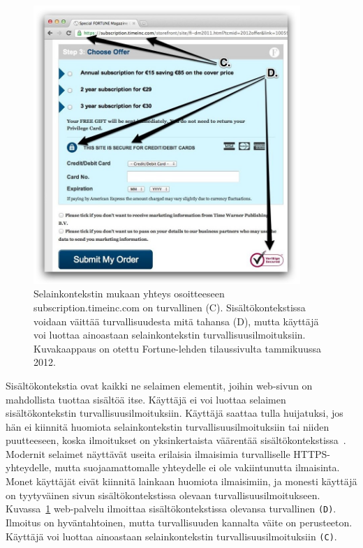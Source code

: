 \documentclass[finnish,gradu]{tktltiki}
\begin{document}
  \begin{figure}[h!]
    \centering
    \includegraphics[width=0.9\textwidth]{images/trust_context_html.jpg}
    \caption[Sisältökontekstin esittely.]{Selainkontekstin mukaan yhteys osoitteeseen subscription.timeinc.com on turvallinen (C). Sisältökontekstissa voidaan väittää turvallisuudesta mitä tahansa (D), mutta käyttäjä voi luottaa ainoastaan selainkontekstin turvallisuusilmoituksiin. Kuvakaappaus on otettu Fortune-lehden tilaussivulta tammikuussa 2012.}
    \label{fig:trust_context_html}
  \end{figure}

  Sisältökontekstia ovat kaikki ne selaimen elementit, joihin web-sivun on mahdollista tuottaa sisältöä itse. Käyttäjä ei voi luottaa selaimen sisältökontekstin turvallisuusilmoituksiin. Käyttäjä saattaa tulla huijatuksi, jos hän ei kiinnitä huomiota selainkontekstin turvallisuusilmoituksiin tai niiden puutteeseen, koska ilmoitukset on yksinkertaista väärentää sisältökontekstissa~\cite{why_phishing_works_06}. Modernit selaimet näyttävät useita erilaisia ilmaisimia turvalliselle HTTPS-yhteydelle, mutta suojaamattomalle yhteydelle ei ole vakiintunutta ilmaisinta. Monet käyttäjät eivät kiinnitä lainkaan huomiota ilmaisimiin, ja monesti käyttäjä on tyytyväinen sivun sisältökontekstissa olevaan turvallisuusilmoitukseen. Kuvassa~\ref{fig:trust_context_html} web-palvelu ilmoittaa sisältökontekstissa olevansa turvallinen \verb!(D)!. Ilmoitus on hyväntahtoinen, mutta turvallisuuden kannalta väite on perusteeton. Käyttäjä voi luottaa ainoastaan selainkontekstin turvallisuusilmoituksiin \verb!(C)!.
\end{document}
